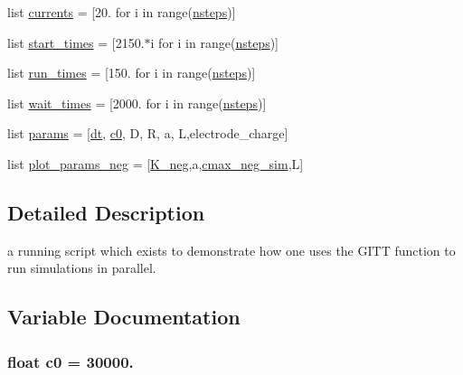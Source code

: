 \begin{DoxyCompactItemize}
list \hyperlink{namespaceuser__input__parallel__simulation_a216022bdba987f127b6cc081ee78e2bd}{currents} = \mbox{[}20. for i in range(\hyperlink{namespaceuser__input__parallel__simulation_aa2414080b021dbb9b56eeaeedec0ffa2}{nsteps})\mbox{]}
\item 
list \hyperlink{namespaceuser__input__parallel__simulation_a377a515511d37e8c7ac5501847d6485d}{start\-\_\-times} = \mbox{[}2150.$\ast$i for i in range(\hyperlink{namespaceuser__input__parallel__simulation_aa2414080b021dbb9b56eeaeedec0ffa2}{nsteps})\mbox{]}
\item 
list \hyperlink{namespaceuser__input__parallel__simulation_a5a6deb885420d2b81e210e580767b1c1}{run\-\_\-times} = \mbox{[}150. for i in range(\hyperlink{namespaceuser__input__parallel__simulation_aa2414080b021dbb9b56eeaeedec0ffa2}{nsteps})\mbox{]}
\item 
list \hyperlink{namespaceuser__input__parallel__simulation_ae584b229c7b1ea3d8330e6038884ffd3}{wait\-\_\-times} = \mbox{[}2000. for i in range(\hyperlink{namespaceuser__input__parallel__simulation_aa2414080b021dbb9b56eeaeedec0ffa2}{nsteps})\mbox{]}
\item 
list \hyperlink{namespaceuser__input__parallel__simulation_ad4a342a882e80fb0b1b0a80df4b9321b}{params} = \mbox{[}\hyperlink{namespaceuser__input__parallel__simulation_a778e38aa889751afffa2dea6b803e67a}{dt}, \hyperlink{namespaceuser__input__parallel__simulation_aa3407022b348cd058d9808eed482ab4a}{c0}, D, R, a, L,electrode\-\_\-charge\mbox{]}
\item 
list \hyperlink{namespaceuser__input__parallel__simulation_a0861e0e85d9d6139e0cc3cc1cc4fa692}{plot\-\_\-params\-\_\-neg} = \mbox{[}\hyperlink{namespaceuser__input__parallel__simulation_a64d0c5854299798787675bc91586023c}{K\-\_\-neg},a,\hyperlink{namespaceuser__input__parallel__simulation_ab7633a5e9c70aabfe6992e4fe521a1f9}{cmax\-\_\-neg\-\_\-sim},L\mbox{]}
\end{DoxyCompactItemize}


\subsection{Detailed Description}
a running script which exists to demonstrate how one uses the G\-I\-T\-T function to run simulations in parallel. 

\subsection{Variable Documentation}
\hypertarget{namespaceuser__input__parallel__simulation_aa3407022b348cd058d9808eed482ab4a}{
\subsubsection[{c0}]{\setlength{\rightskip}{0pt plus 5cm}float c0 = 30000.}}\label{namespaceuser__input__parallel__simulation_aa3407022b348cd058d9808eed482ab4a}


